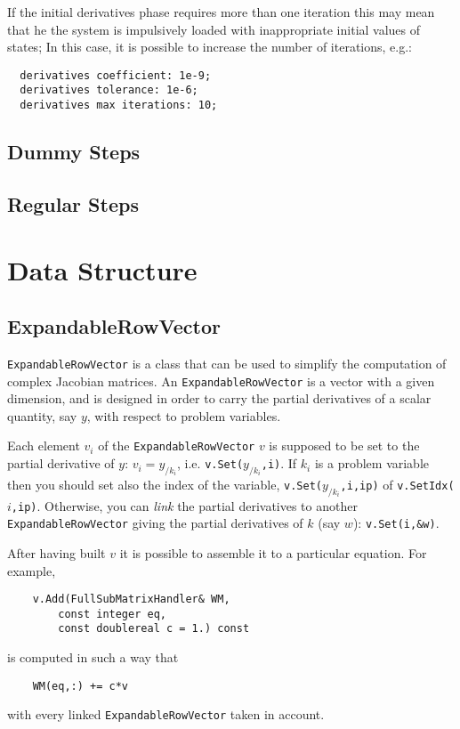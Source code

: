 \documentclass[10pt,dvips]{report}
\begin{document}
\noindent
If the initial derivatives phase requires
more than one iteration  
this may mean that he 
the system is impulsively loaded  with inappropriate 
initial values of states; 
In this case, it is possible to increase the number of iterations, e.g.:
\begin{verbatim}
  derivatives coefficient: 1e-9;
  derivatives tolerance: 1e-6;
  derivatives max iterations: 10; 
\end{verbatim}
\section{Dummy Steps}
\section{Regular Steps}

\chapter{Data Structure}
\section{ExpandableRowVector}
\texttt{ExpandableRowVector} is a class that can be used to
simplify the computation of complex Jacobian matrices.
An \texttt{ExpandableRowVector} is a vector with a given dimension,
and is designed in order to carry the partial derivatives
of a scalar quantity, say $y$, with respect to problem variables.

\noindent
Each element $v_i$ of the \texttt{ExpandableRowVector} $v$ 
is supposed to be set to the partial derivative
of $y$: $v_i = y_{/k_i}$, i.e. \texttt{v.Set($y_{/k_i}$,i)}.
If $k_i$ is a problem variable then you should set also
the index of the variable, \texttt{v.Set($y_{/k_i}$,i,ip)}
of \texttt{v.SetIdx($i$,ip)}. Otherwise, you can
\emph{link} the partial derivatives to another \texttt{ExpandableRowVector}
giving the partial derivatives of $k$ (say $w$): \texttt{v.Set(i,\&w)}.

\noindent
After having built $v$ it is possible to assemble it 
to a particular equation. For example,
\begin{verbatim}
    v.Add(FullSubMatrixHandler& WM,
        const integer eq,
        const doublereal c = 1.) const
\end{verbatim}
is computed in such a way that
\begin{verbatim}
    WM(eq,:) += c*v
\end{verbatim}
with every linked \texttt{ExpandableRowVector} taken in account.
\end{document}
